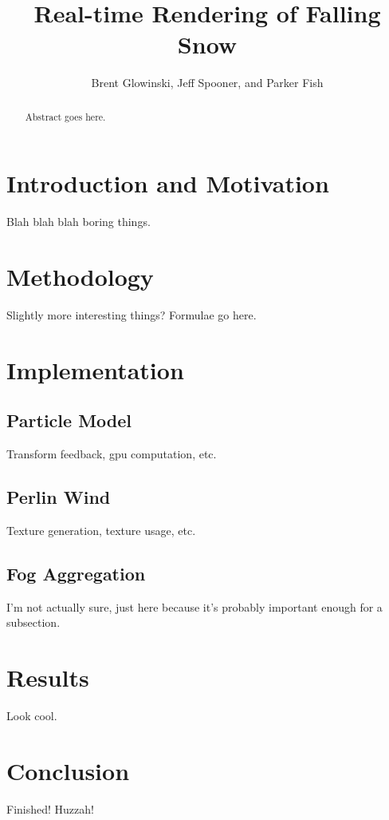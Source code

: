 \documentclass[conference]{acmsiggraph}
\title{Real-time Rendering of Falling Snow}
\author{Brent Glowinski, Jeff Spooner, and Parker Fish}
\begin{document}
\maketitle

\begin{abstract}

Abstract goes here.

\end{abstract}

\keywordlist

\copyrightspace

\section{Introduction and Motivation}
Blah blah blah boring things.

\section{Methodology}
Slightly more interesting things? Formulae go here.

\section{Implementation}
\subsection{Particle Model}
Transform feedback, gpu computation, etc.

\subsection{Perlin Wind}
Texture generation, texture usage, etc.

\subsection{Fog Aggregation}
I'm not actually sure, just here because it's probably important enough for a subsection.

\section{Results}
Look cool.

\section{Conclusion}
Finished! Huzzah!


\nocite{*}

\end{document}
